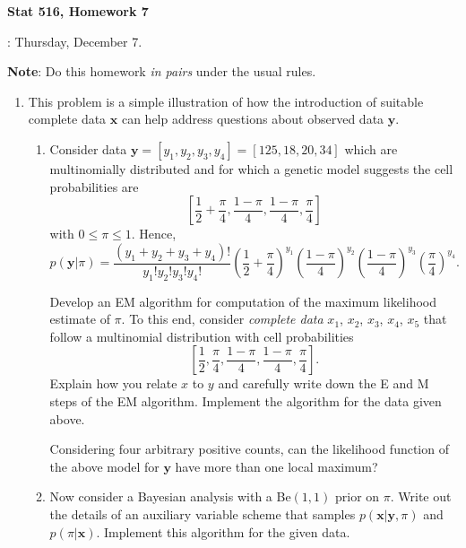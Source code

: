 \mathbf{y}\documentclass{article} %
\newcommand{\sectionname}[1]{\vspace{0.5cm} \noindent {\bf #1}}
\begin{document}
\begin{center}
  \textbf{\large Stat 516, Homework 7}
\end{center}
\sectionname{Due date}:  Thursday, December 7.

\noindent
{\bf Note}: Do this homework \emph{in pairs} under the usual rules.


\begin{enumerate}



\item This problem is a simple illustration of how the
  introduction of suitable complete data $\mathbf{x}$ can help address
  questions about observed data $\mathbf{y}$.
\begin{enumerate}
\item
Consider data $\mathbf{y}=[y_1,y_2,y_3,y_4]=[125,18,20,34]$ which are multinomially distributed and for which a genetic model suggests the cell probabilities are
$$\left[ \frac{1}{2} + \frac{\pi}{4},\frac{1-\pi}{4},\frac{1-\pi}{4},\frac{\pi}{4}
\right]
$$
with $0 \leq \pi \leq 1$.
Hence,
$$p(\mathbf{y}|\pi) = \frac{(y_1+y_2+y_3+y_4)!}{y_1!y_2!y_3!y_4!}
\left(\frac{1}{2}+ \frac{\pi}{4}\right)^{y_1}\left(\frac{1-\pi}{4}\right)^{y_2}\left(\frac{1-\pi}{4}\right)^{y_3}\left(\frac{\pi}{4}\right)^{y_4}.$$

Develop an EM algorithm for computation of the maximum likelihood
estimate of $\pi$.  To this end, consider {\it complete data} $x_1$,
$x_2$, $x_3$, $x_4$, $x_5$ that follow a multinomial distribution with
cell probabilities
$$\left[ \frac{1}{2},\frac{\pi}{4},\frac{1-\pi}{4},\frac{1-\pi}{4},\frac{\pi}{4}
\right].
$$
Explain how you relate $x$ to $y$ and carefully write down the E
and M steps of the EM algorithm.  Implement the algorithm for the data
given above.
\smallskip

Considering four arbitrary positive counts, can the
likelihood function of the above model for $\mathbf{y}$ have more than one local
maximum?

\item Now consider a Bayesian analysis with a Be$(1,1)$ prior on
  $\pi$. Write out the details of an auxiliary variable scheme that
  samples $p(\mathbf{x}|\mathbf{y},\pi)$ and $p(\pi|\mathbf{x})$. Implement this algorithm
  for the given data.
\end{enumerate}


\end{enumerate}
\end{document}
